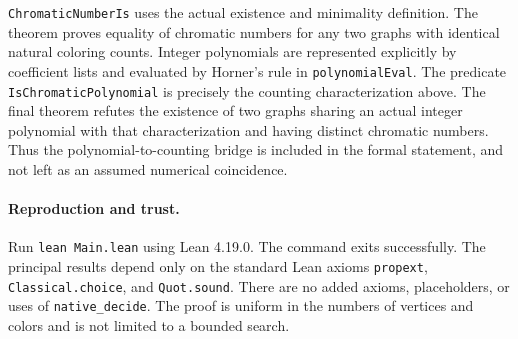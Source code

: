 \documentclass[10pt]{article}
\begin{document}
\texttt{ChromaticNumberIs} uses the actual existence and minimality
definition. The theorem
 proves equality
of chromatic numbers for any two graphs with identical natural
coloring counts. Integer polynomials are represented explicitly by
coefficient lists and evaluated by Horner's rule in
\texttt{polynomialEval}. The predicate \texttt{IsChromaticPolynomial}
is precisely the counting characterization above. The final theorem
 refutes the
existence of two graphs sharing an actual integer polynomial with
that characterization and having distinct chromatic numbers.
Thus the polynomial-to-counting bridge is included in the formal
statement, and not left as an assumed numerical coincidence.

\paragraph{Reproduction and trust.}
Run \texttt{lean Main.lean} using Lean 4.19.0. The command exits
successfully. The principal results depend only on the standard Lean
axioms \texttt{propext}, \texttt{Classical.choice}, and
\texttt{Quot.sound}. There are no added axioms, placeholders, or
uses of \texttt{native\_decide}. The proof is uniform in the numbers
of vertices and colors and is not limited to a bounded search.
\end{document}
